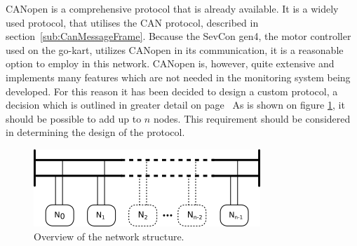 CANopen is a comprehensive protocol that is already available.
It is a widely used protocol, that utilises the CAN protocol, described in section~\ref{sub:CanMessageFrame}.
Because the SevCon gen4, the motor controller used on the go-kart, utilizes CANopen in its communication, it is a reasonable option to employ in this network.
CANopen is, however, quite extensive and implements many features which are not needed in the monitoring system being developed.
For this reason it has been decided to design a custom protocol, a decision which is outlined in greater detail on page~\pageref{sub:CANopen}
As is shown on figure \ref{fig:analysisnodes}, it should be possible to add up to $n$ nodes.
This requirement should be considered in determining the design of the protocol.

\begin{figure}
	\centering
	\includegraphics[width=.75\linewidth]{graphics/analysis_nodes}
	\caption{Overview of the network structure.}
	\label{fig:analysisnodes}
\end{figure}

